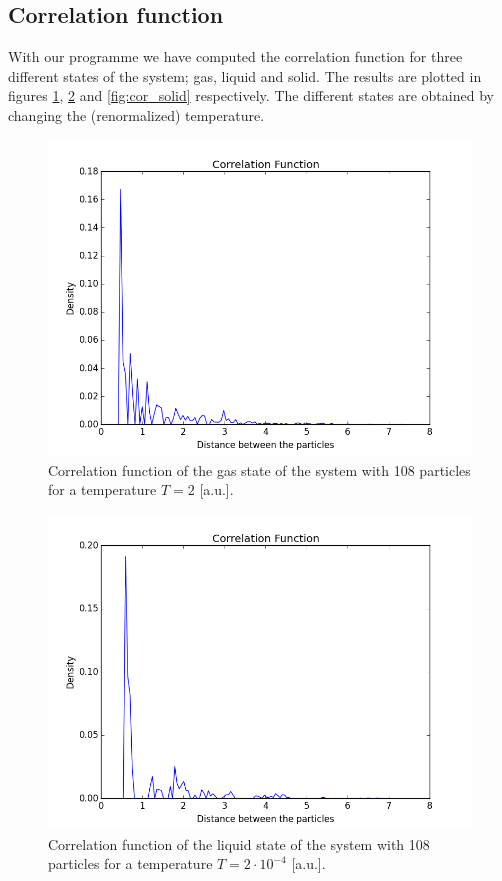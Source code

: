 \documentclass[a4paper,twoside,12pt]{article}
\begin{document}
\subsection{Correlation function}

\noindent With our programme we have computed the correlation function for three different states of the system; gas, liquid and solid. The results are plotted in figures \ref{fig:cor_gas}, \ref{fig:cor_liquid} and \ref{fig:cor_solid} respectively. The different states are obtained by changing the (renormalized) temperature.

\begin{figure}
\centering
\includegraphics[scale=0.6]{figures/Corr_func_gas_2.png}
\caption{Correlation function of the gas state of the system with 108 particles for a temperature $T=2$ [a.u.].}
\label{fig:cor_gas}
\end{figure}

\begin{figure}
\centering
\includegraphics[scale=0.6]{figures/Corr_func_liquid_2e-4.png}
\caption{Correlation function of the liquid state of the system with 108 particles for a temperature $T=2 \cdot 10^{-4}$ [a.u.].}
\label{fig:cor_liquid}
\end{figure}
\end{document}
